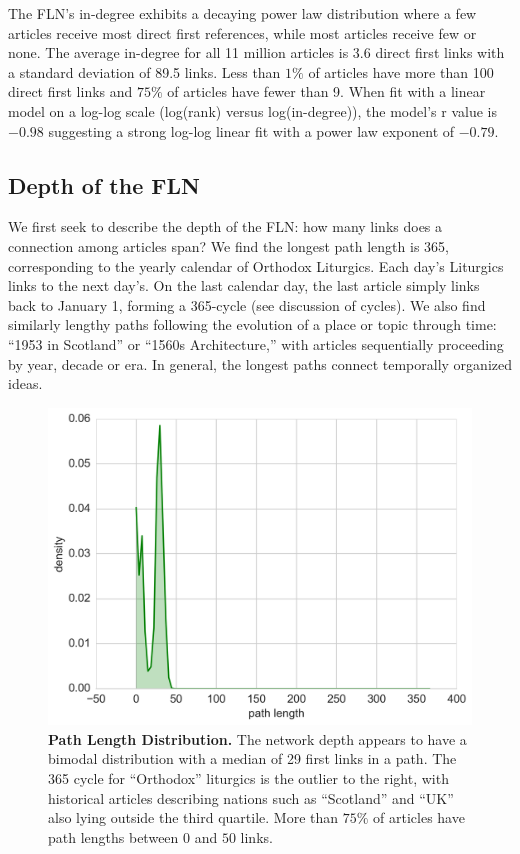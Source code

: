 \documentclass[pre,twocolumn,twoside,superscriptaddress,floatfix, aps, 10pt]{revtex4-1}
\begin{document}
The FLN's in-degree exhibits a decaying power law distribution where a few articles 
receive most direct first references, while most articles receive few or none.
The average in-degree for all 11 million articles is 3.6 direct first links with a standard deviation of 89.5 links.
Less than $1\%$ of articles have more than 100 direct first links and $75\%$ of articles
have fewer than 9. 
When fit with a linear model on a log-log scale (log(rank) versus log(in-degree)), 
the model's r value is $-0.98$ suggesting a strong log-log linear fit 
with a power law exponent of $-0.79$.\\



\subsection{Depth of the FLN}

We first seek to describe the depth of the FLN: how many links does a 
connection among articles span? 
We find the longest path length is 365,
corresponding to the yearly calendar of Orthodox Liturgics.
Each day's Liturgics links to the next day's. On the last calendar day, the last article simply links back to January 1, forming a 365-cycle 
(see discussion of cycles).
We also find similarly lengthy paths following the evolution of a place or topic through time: 
``1953 in Scotland'' or ``1560s Architecture,'' with articles sequentially proceeding by year, decade or era.
In general, the longest paths connect temporally organized ideas.

\begin{figure}[tp!]
  \includegraphics[width=\columnwidth]{graphics/path_lengths_dist.png}
  \caption{
    \textbf{Path Length Distribution.}
The network depth appears to have a bimodal distribution with a median of 29 first links in a path.
The 365 cycle for ``Orthodox'' liturgics is the outlier to the right, with historical articles 
describing nations such as ``Scotland'' and ``UK'' also lying outside the third quartile.
More than $75\%$ of articles have path lengths between 
$0$ and $50$ links.}
  \label{fig:Path Length Distribution}
\end{figure}
\end{document}
